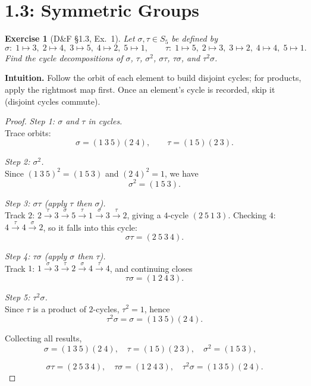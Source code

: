 \documentclass[12pt]{article}
\newtheorem{exercise}[theorem]{Exercise}
\theoremstyle{definition}
\begin{document}
\newpage

\dotfill
\section*{1.3: Symmetric Groups}
\dotfill

\newpage

\begin{exercise}[D\&F §1.3, Ex.~1]
Let $\sigma,\tau\in S_{5}$ be defined by
\[
\sigma:\;1\mapsto3,\;2\mapsto4,\;3\mapsto5,\;4\mapsto2,\;5\mapsto1,
\qquad
\tau:\;1\mapsto5,\;2\mapsto3,\;3\mapsto2,\;4\mapsto4,\;5\mapsto1.
\]
Find the cycle decompositions of $\sigma$, $\tau$, $\sigma^{2}$, $\sigma\tau$, $\tau\sigma$, and $\tau^{2}\sigma$.
\end{exercise}

\dotfill

\noindent
\textbf{Intuition.}
Follow the orbit of each element to build disjoint cycles; for products, apply the rightmost map first.
Once an element’s cycle is recorded, skip it (disjoint cycles commute).

\dotfill

\begin{proof}
\noindent\emph{Step 1: $\sigma$ and $\tau$ in cycles.}\\
Trace orbits:
\[
\sigma=(1\ 3\ 5)(2\ 4),\qquad \tau=(1\ 5)(2\ 3).
\]

\dotfill

\noindent\emph{Step 2: $\sigma^{2}$.}\\
Since $(1\ 3\ 5)^2=(1\ 5\ 3)$ and $(2\ 4)^2=1$, we have
\[
\sigma^{2}=(1\ 5\ 3).
\]

\dotfill

\noindent\emph{Step 3: $\sigma\tau$ (apply $\tau$ then $\sigma$).}\\
Track $2$: $2\xrightarrow{\tau}3\xrightarrow{\sigma}5\xrightarrow{\tau}1\xrightarrow{\sigma}3\xrightarrow{\tau}2$,
giving a $4$-cycle $(2\ 5\ 1\ 3)$. Checking $4$: $4\xrightarrow{\tau}4\xrightarrow{\sigma}2$, so it falls into this cycle:
\[
\sigma\tau=(2\ 5\ 3\ 4).
\]

\dotfill

\noindent\emph{Step 4: $\tau\sigma$ (apply $\sigma$ then $\tau$).}\\
Track $1$: $1\xrightarrow{\sigma}3\xrightarrow{\tau}2\xrightarrow{\sigma}4\xrightarrow{\tau}4$, and continuing closes
\[
\tau\sigma=(1\ 2\ 4\ 3).
\]

\dotfill

\noindent\emph{Step 5: $\tau^{2}\sigma$.}\\
Since $\tau$ is a product of $2$-cycles, $\tau^{2}=1$, hence
\[
\tau^{2}\sigma=\sigma=(1\ 3\ 5)(2\ 4).
\]

\dotfill

Collecting all results,
\[
\sigma=(1\ 3\ 5)(2\ 4),\quad
\tau=(1\ 5)(2\ 3),\quad
\sigma^{2}=(1\ 5\ 3),\quad
\]

\[
\sigma\tau=(2\ 5\ 3\ 4),\quad
\tau\sigma=(1\ 2\ 4\ 3),\quad
\tau^{2}\sigma=(1\ 3\ 5)(2\ 4).
\]

\end{proof}
\end{document}
